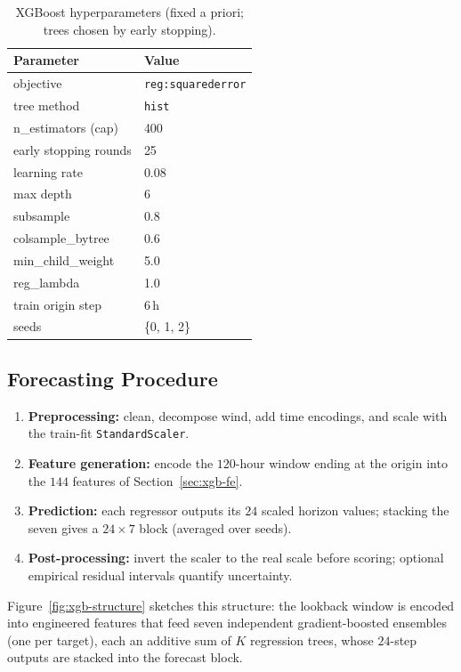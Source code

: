 \documentclass[12pt,a4paper,oneside]{report}
\begin{document}
\begin{table}[H]
\centering
\caption{XGBoost hyperparameters (fixed a priori; trees chosen by early stopping).}
\label{tab:xgb-hparams}
\begin{tabular}{ll}
\toprule
\textbf{Parameter} & \textbf{Value} \\
\midrule
objective             & \texttt{reg:squarederror} \\
tree method           & \texttt{hist} \\
n\_estimators (cap)   & 400 \\
early stopping rounds & 25 \\
learning rate         & 0.08 \\
max depth             & 6 \\
subsample             & 0.8 \\
colsample\_bytree     & 0.6 \\
min\_child\_weight    & 5.0 \\
reg\_lambda           & 1.0 \\
train origin step     & 6\,h \\
seeds                 & \{0, 1, 2\} \\
\bottomrule
\end{tabular}
\end{table}

\subsection{Forecasting Procedure}
\label{sec:xgb-predict}
\begin{enumerate}
  \item \textbf{Preprocessing:} clean, decompose wind, add time encodings, and
        scale with the train-fit \texttt{StandardScaler}.
  \item \textbf{Feature generation:} encode the $120$-hour window ending at the
        origin into the $144$ features of Section~\ref{sec:xgb-fe}.
  \item \textbf{Prediction:} each regressor outputs its $24$ scaled horizon values;
        stacking the seven gives a $24 \times 7$ block (averaged over seeds).
  \item \textbf{Post-processing:} invert the scaler to the real scale before
        scoring; optional empirical residual intervals quantify uncertainty.
\end{enumerate}

Figure~\ref{fig:xgb-structure} sketches this structure: the lookback window is
encoded into engineered features that feed seven independent gradient-boosted
ensembles (one per target), each an additive sum of $K$ regression trees, whose
$24$-step outputs are stacked into the forecast block.
\end{document}
